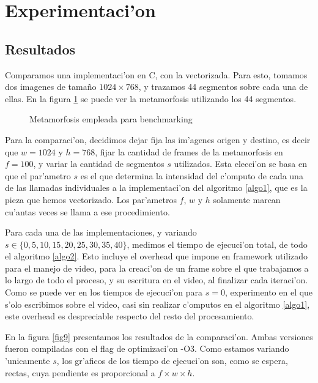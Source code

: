 \section{Experimentaci'on}

\subsection{Resultados}

Comparamos una implementaci'on en C, con la vectorizada. Para esto, tomamos dos imagenes de tama\~{n}o $1024 \times 768$, y trazamos 44 segmentos sobre cada una de ellas. En la figura \ref{fig8} se puede ver la metamorfosis utilizando los 44 segmentos.

\begin{figure}[H]
	\begin{center}
	\end{center}		
	\caption{Metamorfosis empleada para benchmarking}
	\label{fig8}
\end{figure}

Para la comparaci'on, decidimos dejar fija las im'agenes origen y destino, es decir que $w = 1024$ y $h = 768$, fijar la cantidad de frames de la metamorfosis en $f = 100$, y variar la cantidad de segmentos $s$ utilizados. Esta elecci'on se basa en que el par'ametro $s$ es el que determina la intensidad del c'omputo de cada una de las llamadas individuales a la implementaci'on del algoritmo \ref{algo1}, que es la pieza que hemos vectorizado. Los par'ametros $f$, $w$ y $h$ solamente marcan cu'antas veces se llama a ese procedimiento.

Para cada una de las implementaciones, y variando $s \in \{0, 5, 10, 15, 20, 25, 30, 35, 40\}$, medimos el tiempo de ejecuci'on total, de todo el algoritmo \ref{algo2}. Esto incluye el overhead que impone en framework utilizado para el manejo de video, para la creaci'on de un frame sobre el que trabajamos a lo largo de todo el proceso, y su escritura en el video, al finalizar cada iteraci'on. Como se puede ver en los tiempos de ejecuci'on para $s = 0$, experimento en el que s'olo escribimos sobre el video, casi sin realizar c'omputos en el algoritmo \ref{algo1}, este overhead es despreciable respecto del resto del procesamiento.

En la figura \ref{fig9} presentamos los resultados de la comparaci'on. Ambas versiones fueron compiladas con el flag de optimizaci'on -O3. Como estamos variando 'unicamente $s$, los gr'aficos de los tiempo de ejecuci'on son, como se espera,  rectas, cuya pendiente es proporcional a $f \times w \times h$.

